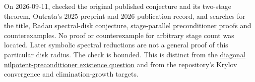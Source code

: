 \documentclass[11pt,a4paper]{article}
\begin{document}
On 2026-09-11, checked the original published conjecture and its
two-stage theorem, Outrata's 2025 preprint and 2026 publication record,
and searches for the title, Radau spectral-disk conjecture,
stage-parallel preconditioner proofs and counterexamples. No proof or
counterexample for arbitrary stage count was located. Later symbolic
spectral reductions are not a general proof of this particular disk
radius. The check is bounded. This is distinct from the
\href{https://github.com/ajt60gaibb/OpenProblemsInNLA/blob/main/linear-systems-and-elimination/IE-28/README.md}{diagonal
nilpotent-preconditioner existence question} and from the repository's
Krylov convergence and elimination-growth targets.
\end{document}
